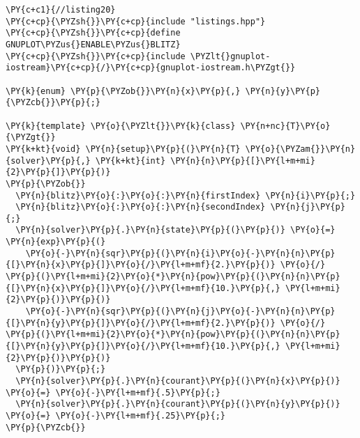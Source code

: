 \begin{Verbatim}[commandchars=\\\{\}]
\PY{c+c1}{//listing20}
\PY{c+cp}{\PYZsh{}}\PY{c+cp}{include "listings.hpp"}
\PY{c+cp}{\PYZsh{}}\PY{c+cp}{define GNUPLOT\PYZus{}ENABLE\PYZus{}BLITZ}
\PY{c+cp}{\PYZsh{}}\PY{c+cp}{include \PYZlt{}gnuplot-iostream}\PY{c+cp}{/}\PY{c+cp}{gnuplot-iostream.h\PYZgt{}}

\PY{k}{enum} \PY{p}{\PYZob{}}\PY{n}{x}\PY{p}{,} \PY{n}{y}\PY{p}{\PYZcb{}}\PY{p}{;}

\PY{k}{template} \PY{o}{\PYZlt{}}\PY{k}{class} \PY{n+nc}{T}\PY{o}{\PYZgt{}}
\PY{k+kt}{void} \PY{n}{setup}\PY{p}{(}\PY{n}{T} \PY{o}{\PYZam{}}\PY{n}{solver}\PY{p}{,} \PY{k+kt}{int} \PY{n}{n}\PY{p}{[}\PY{l+m+mi}{2}\PY{p}{]}\PY{p}{)} 
\PY{p}{\PYZob{}}
  \PY{n}{blitz}\PY{o}{:}\PY{o}{:}\PY{n}{firstIndex} \PY{n}{i}\PY{p}{;}
  \PY{n}{blitz}\PY{o}{:}\PY{o}{:}\PY{n}{secondIndex} \PY{n}{j}\PY{p}{;}
  \PY{n}{solver}\PY{p}{.}\PY{n}{state}\PY{p}{(}\PY{p}{)} \PY{o}{=} \PY{n}{exp}\PY{p}{(}
    \PY{o}{-}\PY{n}{sqr}\PY{p}{(}\PY{n}{i}\PY{o}{-}\PY{n}{n}\PY{p}{[}\PY{n}{x}\PY{p}{]}\PY{o}{/}\PY{l+m+mf}{2.}\PY{p}{)} \PY{o}{/} \PY{p}{(}\PY{l+m+mi}{2}\PY{o}{*}\PY{n}{pow}\PY{p}{(}\PY{n}{n}\PY{p}{[}\PY{n}{x}\PY{p}{]}\PY{o}{/}\PY{l+m+mf}{10.}\PY{p}{,} \PY{l+m+mi}{2}\PY{p}{)}\PY{p}{)}
    \PY{o}{-}\PY{n}{sqr}\PY{p}{(}\PY{n}{j}\PY{o}{-}\PY{n}{n}\PY{p}{[}\PY{n}{y}\PY{p}{]}\PY{o}{/}\PY{l+m+mf}{2.}\PY{p}{)} \PY{o}{/} \PY{p}{(}\PY{l+m+mi}{2}\PY{o}{*}\PY{n}{pow}\PY{p}{(}\PY{n}{n}\PY{p}{[}\PY{n}{y}\PY{p}{]}\PY{o}{/}\PY{l+m+mf}{10.}\PY{p}{,} \PY{l+m+mi}{2}\PY{p}{)}\PY{p}{)}
  \PY{p}{)}\PY{p}{;}  
  \PY{n}{solver}\PY{p}{.}\PY{n}{courant}\PY{p}{(}\PY{n}{x}\PY{p}{)} \PY{o}{=} \PY{o}{-}\PY{l+m+mf}{.5}\PY{p}{;} 
  \PY{n}{solver}\PY{p}{.}\PY{n}{courant}\PY{p}{(}\PY{n}{y}\PY{p}{)} \PY{o}{=} \PY{o}{-}\PY{l+m+mf}{.25}\PY{p}{;}
\PY{p}{\PYZcb{}}


\end{Verbatim}
